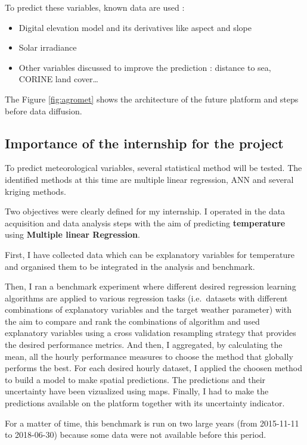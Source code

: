 \documentclass[12pt,twoside]{reedthesis}
\providecommand{\tightlist}{%
  \setlength{\itemsep}{0pt}\setlength{\parskip}{0pt}}
\theoremstyle{definition}
\theoremstyle{definition}
\theoremstyle{definition}
\theoremstyle{remark}
\begin{document}
To predict these variables, known data are used :
\begin{itemize}
\tightlist
\item
  Digital elevation model and its derivatives like aspect and slope
\item
  Solar irradiance
\item
  Other variables discussed to improve the prediction : distance to sea,
  CORINE land cover\ldots{}
\end{itemize}
The Figure \ref{fig:agromet} shows the architecture of the future
platform and steps before data diffusion.

\subsection{Importance of the internship for the
project}\label{importance-of-the-internship-for-the-project}

To predict meteorological variables, several statistical method will be
tested. The identified methods at this time are multiple linear
regression, ANN and several kriging methods.

Two objectives were clearly defined for my internship. I operated in the
data acquisition and data analysis steps with the aim of predicting
\textbf{temperature} using \textbf{Multiple linear Regression}.

First, I have collected data which can be explanatory variables for
temperature and organised them to be integrated in the analysis and
benchmark.

Then, I ran a benchmark experiment where different desired regression
learning algorithms are applied to various regression tasks
(i.e.~datasets with different combinations of explanatory variables and
the target weather parameter) with the aim to compare and rank the
combinations of algorithm and used explanatory variables using a cross
validation resampling strategy that provides the desired performance
metrics. And then, I aggregated, by calculating the mean, all the hourly
performance measures to choose the method that globally performs the
best. For each desired hourly dataset, I applied the choosen method to
build a model to make spatial predictions. The predictions and their
uncertainty have been vizualized using maps. Finally, I had to make the
predictions available on the platform together with its uncertainty
indicator.

For a matter of time, this benchmark is run on two large years (from
2015-11-11 to 2018-06-30) because some data were not available before
this period.
\end{document}
